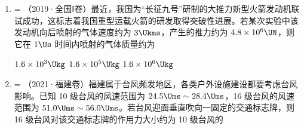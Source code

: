 \documentclass[\gkver]{gaokaozhenti}
\makeatletter
\newcommand{\tiinfo}[2]{{\small\color{gray}（#1）\textcolor{orange!85!black}{\nandu{#2}}}\hspace{0.4em}}
\newenvironment{tibody}
  {\begin{minipage}[t]{\linewidth}\@listdepth=\@ne\leavevmode\ignorespaces}
  {\end{minipage}}
\makeatother
\begin{document}
\begin{enumerate}[resume=tiku]
{在最低点，由牛顿第二定律可得 $F-mg=m\frac{v^{2}}{l}$，

解得 $F=mg(3-2\cos\theta)$。

b．若 $\theta$ 较小，释放后小球做简谐运动，根据单摆周期公式可得 $T=2\pi\sqrt{\frac{l}{g}}$。

根据动量定理可得 $I-mgT=\Delta p=0$，

联立解得一个周期内绳对小球拉力的冲量大小为 $I=2\pi m\sqrt{gl}$。

（2）使小球在水平面内做匀速圆周运动，轻绳与竖直方向夹角为 $\theta$，根据牛顿第二定律可得 $mg\tan\theta=m\frac{4\pi^{2}}{T^{2}}r$，

其中 $r=l\sin\theta$，

解得小球运动的周期为 $T'=2\pi\sqrt{\frac{l\cos\theta}{g}}$。

而（1）b 中小球运动的周期为 $T=2\pi\sqrt{\frac{l}{g}}$，

由于 $\cos\theta<1$，可得 $T'<T$，即（2）中小球运动的周期小于（1）b 中小球运动的周期。
}

\item
\begin{tibody}
\tiinfo{2019·全国Ⅰ卷}{2}最近，我国为“长征九号”研制的大推力新型火箭发动机联试成功，这标志着我国重型运载火箭的研发取得突破性进展。若某次实验中该发动机向后喷射的气体速度约为 $3\Ukms$，产生的推力约为 $4.8\times10^{6}\UN$，则它在 $1\Us$ 时间内喷射的气体质量约为

{$1.6\times10^{3}\Ukg$}
{$1.6\times10^{5}\Ukg$}
{$1.6\times10^{6}\Ukg$}
\end{tibody}


\item
\begin{tibody}
\tiinfo{2021·福建卷}{2}福建属于台风频发地区，各类户外设施建设都要考虑台风影响。已知 10 级台风的风速范围为 $24.5 \Ums \sim 28.4 \Ums$，16 级台风的风速范围为 $51.0 \Ums \sim 56.0 \Ums$。若台风迎面垂直吹向一固定的交通标志牌，则 16 级台风对该交通标志牌的作用力大小约为 10 级台风的 


\end{tibody}
\end{enumerate}
\end{document}
